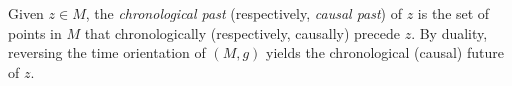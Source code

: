 Given $z \in M$, the \emph{chronological past} (respectively, \emph{causal past}) of $z$ is the set of points in $M$ that chronologically (respectively, causally) precede $z$. By duality, reversing the time orientation of $(M, g)$ yields the chronological (causal) future of $z$.
